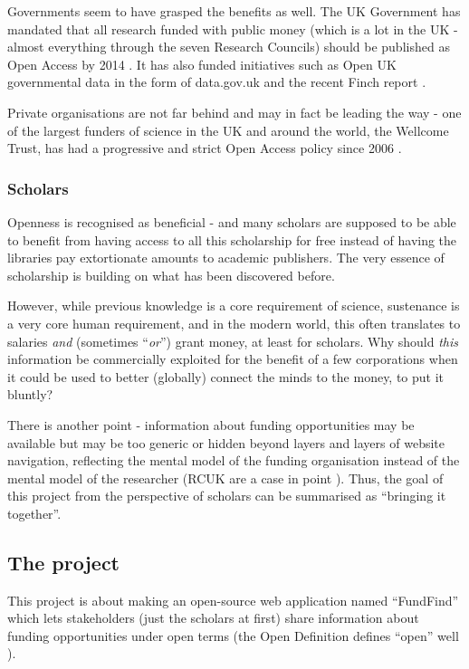 \documentclass[11pt,fleqn,twoside]{article}
\begin{document}
Governments seem to have grasped the benefits as well. The UK Government has mandated that all research funded with public money (which is a lot in the UK - almost everything through the seven Research Councils) should be published as Open Access by 2014 \cite{guardian-ukgov-oa2014}. It has also funded initiatives such as Open UK governmental data in the form of data.gov.uk \cite{open-uk-gov-data} and the recent Finch report \cite{guardian-finch} \cite{finch}.

Private organisations are not far behind and may in fact be leading the way - one of the largest funders of science in the UK and around the world, the Wellcome Trust, has had a progressive and strict Open Access policy since 2006 \cite{wellcome-oa}.

\subsubsection{Scholars}
Openness is recognised as beneficial - and many scholars are supposed to be able to benefit from having access to all this scholarship for free instead of having the libraries pay extortionate amounts to academic publishers. The very essence of scholarship is building on what has been discovered before.

However, while previous knowledge is a core requirement of science, sustenance is a very core human requirement, and in the modern world, this often translates to salaries \emph{and} (sometimes ``\emph{or}'') grant money, at least for scholars. Why should \emph{this} information be commercially exploited for the benefit of a few corporations when it could be used to better (globally) connect the minds to the money, to put it bluntly?

There is another point - information about funding opportunities may be available but may be too generic or hidden beyond layers and layers of website navigation, reflecting the mental model of the funding organisation instead of the mental model of the researcher (RCUK are a case in point \cite{rcuk-home}). Thus, the goal of this project from the perspective of scholars can be summarised as ``bringing it together''.

\subsection{The project}
This project is about making an open-source web application named ``FundFind'' which lets stakeholders (just the scholars at first) share information about funding opportunities under open terms (the Open Definition defines ``open'' well \cite{od}).
\end{document}
